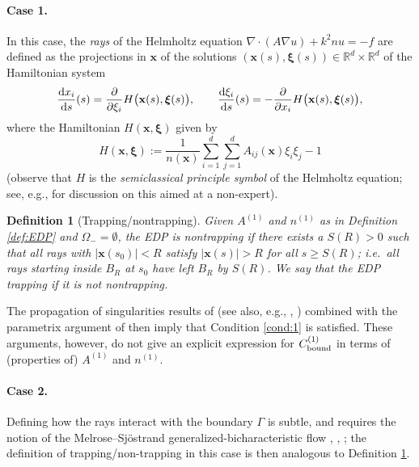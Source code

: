 \documentclass[10pt]{article}%
\newtheorem{definition}[theorem]{Definition}
\numberwithin{equation}{section}
\newcommand{\beq}{\begin{equation}}
\newcommand{\eeq}{\end{equation}}
\newcommand{\beqs}{\begin{equation*}}
\newcommand{\eeqs}{\end{equation*}}
\newcommand{\bx}{\mathbf{x}}
\newcommand{\bxi}{{\boldsymbol{\xi}}}
\newcommand{\bze}{\mathbf{0}}
\newcommand{\supp}{\mathrm{supp}}
\newcommand{\rd}{{\rm d}}
\newcommand{\Rea}{\mathbb{R}}
\newcommand{\diff}[2]{\frac{\rd #1}{\rd #2}}
\newcommand{\pdiff}[2]{\frac{\partial #1}{\partial #2}}
\newcommand{\Oi}{{\Omega_-}}
\newcommand{\gu}{\nabla u}
\newcommand{\coeffAo}{A^{(1)}}
\newcommand{\coeffno}{n^{(1)}}
\begin{document}
\paragraph{Case 1.}
In this case, %
the \emph{rays} of the Helmholtz equation $\nabla\cdot(A\gu)+ k^2 nu =-f$ are defined as the projections in $\bx$ of the solutions $(\bx(s), \bxi(s)) \in \Rea^d\times \Rea^d$ of the Hamiltonian system
\beq\label{eq:rays}
\diff{x_i}{s}(s) = \pdiff{}{\xi_i}H\big(\bx(s), \bxi(s) \big), \qquad
\diff{\xi_i}{s}(s)
 = -\pdiff{}{x_i}H\big(\bx(s), \bxi(s) \big),
\eeq
where the Hamiltonian $H(\bx,\bxi)$ given by 
\beqs
H(\bx,\bxi):= \frac{1}{n(\bx)}\sum_{i=1}^d\sum_{j=1}^{d} A_{ij}(\bx)\xi_i \xi_j - 1%
\eeqs
(observe that $H$ is the \emph{semiclassical principle symbol} of the Helmholtz equation; see, e.g., \cite[\S7]{GrPeSp:18} for discussion on this aimed at a non-expert).

\begin{definition}[Trapping/nontrapping]\label{def:trap}
Given $\coeffAo$ and $\coeffno$ as in Definition \ref{def:EDP} and $\Oi=\emptyset$, the EDP is \emph{nontrapping} if 
there exists a $S(R)>0$ such that all rays with $|\bx(s_0)|<R$ satisfy $|\bx(s)|>R$ for all $s\geq S(R)$; i.e.~all rays starting inside $B_R$ at $s_0$ have left $B_R$ by $S(R)$. 
We say that the EDP \emph{trapping} if it is not nontrapping.
\end{definition}

The propagation of singularities results of \cite[\S VI]{DuHo:72} (see also, e.g., \cite[Chapter 24]{Ho:85}, \cite[\S12.3]{Zw:12}) combined with the parametrix argument of \cite{Va:75} then imply that Condition \ref{cond:1} is satisfied. These arguments, however, do not give an explicit expression for $C^{(1)}_{\rm bound}$ in terms of (properties of) $\coeffAo$ and $\coeffno$.

\paragraph{Case 2.}
Defining how the rays interact with the boundary $\Gamma$ is subtle, and requires the notion of the Melrose--Sj{\"o}strand generalized-bicharacteristic flow 
\cite[\S24.3]{Ho:85}, \cite{MeSj:78}, \cite{MeSj:82}; the definition of trapping/non-trapping in this case \cite[Definition 7.20]{MeSj:82} is then analogous to Definition \ref{def:trap}.
\end{document}
